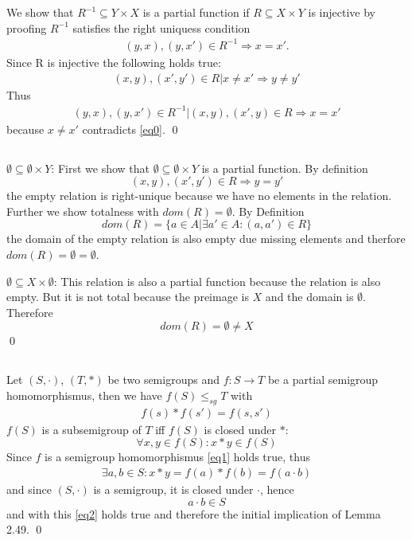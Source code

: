\documentclass[a4paper,12pt,numbers=noenddot]{scrreport}
\begin{document}
\chapter{}
\section{}
We show that $R^{-1} \subseteq Y \times X$ is a partial function if $R \subseteq X \times Y$ is injective by proofing $R^{-1}$ satisfies the right uniquess condition
\begin{align*}
    (y,x), (y,x') \in R^{-1} \Rightarrow x = x'.
\end{align*}
Since R is injective the following holds true:
\begin{align*}
    (x,y), (x',y') \in R | x \neq x' \Rightarrow y \neq y'\label{eq0}\tag{1}
\end{align*}
Thus 
\begin{align*}
    (y,x), (y,x') \in R^{-1} | (x,y), (x', y) \in R  \Rightarrow x = x'
\end{align*}
because $x \neq x'$ contradicts \eqref{eq0}.
\qed

\section{}
$\emptyset \subseteq \emptyset \times Y$:
First we show that $\emptyset \subseteq \emptyset \times Y$ is a partial function.
By definition $$(x,y), (x',y') \in R \Rightarrow y = y'$$ the empty relation is right-unique because we have no elements in the relation.
Further we show totalness with $dom(R) = \emptyset$.
By Definition
$$dom(R) = \{a \in A | \exists a' \in A: (a,a') \in R\}$$
the domain of the empty relation is also empty due missing elements and therfore $dom(R) = \emptyset = \emptyset$.

\vspace{1cm}
$\emptyset \subseteq X \times \emptyset$: This relation is also a partial function because the relation is also empty.
But it is not total because the preimage is $X$ and the domain is $\emptyset$.
Therefore
$$dom(R) = \emptyset \neq X$$
\qed

\section{}
Let $(S, \cdot)$, $(T, *)$ be two semigroups and $f: S \rightarrow T$ be a partial semigroup homomorphismus, then we have $f(S) \leq_{sg} T$ with
\begin{align}
    f(s) * f(s') = f(s, s') \label{eq1}\tag{1}
\end{align}
$f(S)$ is a subsemigroup of $T$ iff $f(S)$ is closed under $*$:
$$\forall x,y \in f(S) : x * y \in f(S)$$
Since $f$ is a semigroup homomorphismus \eqref{eq1} holds true, thus
\begin{align}
    \exists a,b \in S : x * y = f(a) * f(b) = f(a \cdot b) \label{eq2}\tag{2}
\end{align}
and since $(S, \cdot)$ is a semigroup, it is closed under $\cdot$, hence
$$a \cdot b \in S$$
and with this \eqref{eq2} holds true and therefore the initial implication of Lemma 2.49.
\qed

\section{}
\end{document}
